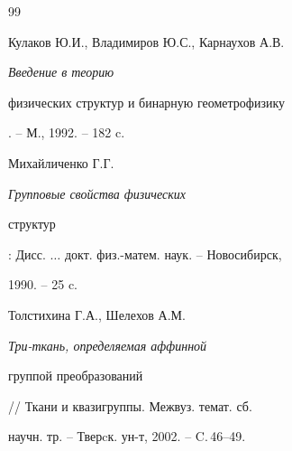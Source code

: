 \begin{thebibliography}{99}


Кулаков Ю.И., Владимиров Ю.С., Карнаухов А.В. {\em Введение в теорию


физических структур и бинарную геометрофизику}. -- М., 1992. -- 182 c.




Михайличенко Г.Г. {\em Групповые свойства физических


структур}\/: Дисс. $\dotsc$ докт. физ.-матем. наук. -- Новосибирск,


1990. -- 25 c.




Толстихина Г.А., Шелехов А.М. {\em Три-ткань, определяемая аффинной


группой преобразований} // Ткани и квазигруппы. Межвуз. темат. сб.


научн. тр. -- Тверcк. ун-т, 2002. -- C.\,46--49.





\end{thebibliography}





\vskip 2cm












\label{end}





